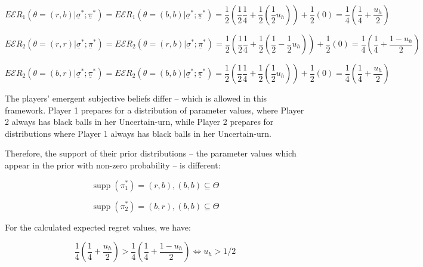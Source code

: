 \documentclass{article}
\theoremstyle{definition}
\DeclareMathOperator\supp{supp}
\begin{document}
\begin{equation}
E\mathcal{E}R_1(\theta=(r,b)|\underline{\sigma}^*;\underline{\pi}^*)
=
E\mathcal{E}R_1(\theta=(b,b)|\underline{\sigma}^*;\underline{\pi}^*)
=
\frac{1}{2} \left (\frac{1}{2} \frac{1}{4}+\frac{1}{2}(\frac{1}{2}u_h) \right)
+
\frac{1}{2} \left (0 \right )
=
\frac{1}{4} \left ( \frac{1}{4} + \frac{u_h}{2} \right )
\end{equation}

\begin{equation}
E\mathcal{E}R_2(\theta=(r,r)|\underline{\sigma}^*;\underline{\pi}^*)
=
E\mathcal{E}R_2(\theta=(r,b)|\underline{\sigma}^*;\underline{\pi}^*)
=
\frac{1}{2} \left (\frac{1}{2} \frac{1}{4}+\frac{1}{2}(\frac{1}{2}-\frac{1}{2}u_h) \right)
+
\frac{1}{2} \left (0 \right )
=
\frac{1}{4} \left ( \frac{1}{4} + \frac{1-u_h}{2} \right )
\end{equation}

\begin{equation}
E\mathcal{E}R_2(\theta=(b,r)|\underline{\sigma}^*;\underline{\pi}^*)
=
E\mathcal{E}R_2(\theta=(b,b)|\underline{\sigma}^*;\underline{\pi}^*)
=
\frac{1}{2} \left (\frac{1}{2} \frac{1}{4}+\frac{1}{2}(\frac{1}{2}u_h) \right)
+
\frac{1}{2} \left (0 \right )
=
\frac{1}{4} \left ( \frac{1}{4} + \frac{u_h}{2} \right )
\end{equation}

The players' emergent subjective beliefs differ -- which is allowed in this framework. Player 1 prepares for a distribution of parameter values, where Player 2 always has black balls in her Uncertain-urn, while Player 2 prepares for distributions where Player 1 always has black balls in her Uncertain-urn.

Therefore, the support of their prior distributions – the parameter values which appear in the prior with non-zero probability – is different:

\begin{equation}
\supp (\pi_1^*) = {(r,b), (b,b) } \subseteq \Theta
\end{equation}

\begin{equation}
\supp (\pi_2^*) = {(b,r), (b,b) } \subseteq \Theta
\end{equation}

For the calculated expected regret values, we have:

\begin{equation}
\frac{1}{4} \left ( \frac{1}{4} + \frac{u_h}{2} \right )
>
\frac{1}{4} \left ( \frac{1}{4} + \frac{1-u_h}{2} \right )
\iff
u_h>1/2
\end{equation}
\end{document}

